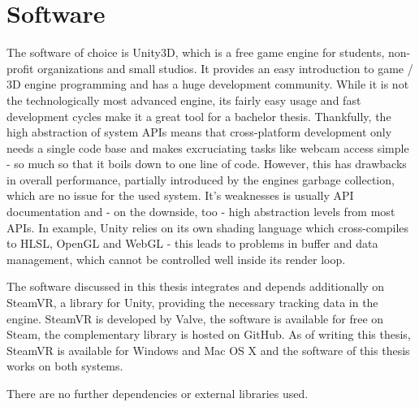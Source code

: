 \section{Software}

The software of choice is Unity3D, which is a free game engine for students, 
non-profit organizations and small studios. It provides an easy introduction to 
game / 3D engine programming and has a huge development community. While it is 
not the technologically most advanced engine, its fairly easy usage and fast 
development cycles make it a great tool for a bachelor thesis.
\newline
Thankfully, the high abstraction of system APIs means that cross-platform 
development only needs a single code base and makes excruciating tasks like 
webcam access simple - so much so that it boils down to one line of code. 
However, this has drawbacks in overall performance, partially introduced by the 
engines garbage collection, which are no issue for the used system.
\newline
It's weaknesses is usually API documentation and - on the downside, too - high 
abstraction levels from most APIs. In example, Unity relies on its own shading 
language which cross-compiles to HLSL, OpenGL and WebGL - this leads to 
problems in buffer and data management, which cannot be controlled well inside 
its render loop.

The software discussed in this thesis integrates and depends additionally on 
SteamVR, a library for Unity, providing the necessary tracking data in the 
engine. SteamVR is developed by Valve, the software is available for free on 
Steam, the complementary library is hosted on GitHub. As of writing this 
thesis, SteamVR is available for Windows and Mac OS X and the software of this 
thesis works on both systems. 

There are no further dependencies or external libraries used.